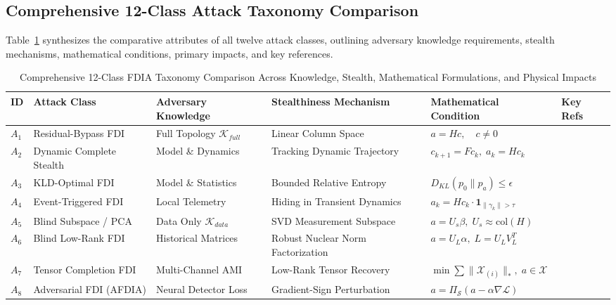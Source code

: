 \documentclass[journal,compsoc]{IEEEtran}
\begin{document}
\subsection{Comprehensive 12-Class Attack Taxonomy Comparison}
Table~\ref{tab:attack_taxonomy} synthesizes the comparative attributes of all twelve attack classes, outlining adversary knowledge requirements, stealth mechanisms, mathematical conditions, primary impacts, and key references.

\begin{table}[!t]
\centering
\caption{Comprehensive 12-Class FDIA Taxonomy Comparison Across Knowledge, Stealth, Mathematical Formulations, and Physical Impacts}
\label{tab:attack_taxonomy}
\small
\begin{tabularx}{\textwidth}{l p{3.2cm} p{2.2cm} p{3.2cm} p{3.5cm} p{1.8cm}}
\toprule
\textbf{ID} & \textbf{Attack Class} & \textbf{Adversary Knowledge} & \textbf{Stealthiness Mechanism} & \textbf{Mathematical Condition} & \textbf{Key Refs} \\
\midrule
$A_1$ & Residual-Bypass FDI & Full Topology $\mathcal{K}_{full}$ & Linear Column Space & $a = Hc, \quad c \ne 0$ & \cite{ref29, ref6, ref8, ref50, ref51} \\
$A_2$ & Dynamic Complete Stealth & Model \& Dynamics & Tracking Dynamic Trajectory & $c_{k+1} = F c_k, \; a_k = H c_k$ & \cite{ref19, ref30, ref26, ref33} \\
$A_3$ & KLD-Optimal FDI & Model \& Statistics & Bounded Relative Entropy & $D_{KL}(p_0 \parallel p_a) \le \epsilon$ & \cite{ref7, ref11, ref63} \\
$A_4$ & Event-Triggered FDI & Local Telemetry & Hiding in Transient Dynamics & $a_k = H c_k \cdot \mathbf{1}_{\|\gamma_k\| > \tau}$ & \cite{ref25, ref76} \\
$A_5$ & Blind Subspace / PCA & Data Only $\mathcal{K}_{data}$ & SVD Measurement Subspace & $a = U_s \beta, \; U_s \approx \text{col}(H)$ & \cite{ref56, ref31, ref32, ref77} \\
$A_6$ & Blind Low-Rank FDI & Historical Matrices & Robust Nuclear Norm Factorization & $a = U_L \alpha, \; L = U_L V_L^T$ & \cite{ref48, ref39, ref41, ref49} \\
$A_7$ & Tensor Completion FDI & Multi-Channel AMI & Low-Rank Tensor Recovery & $\min \sum \|\mathcal{X}_{(i)}\|_*, \; a \in \mathcal{X}$ & \cite{ref59, ref37} \\
$A_8$ & Adversarial FDI (AFDIA) & Neural Detector Loss & Gradient-Sign Perturbation & $a = \Pi_{\mathcal{S}} (a - \alpha \nabla \mathcal{L})$ & \cite{ref35, ref80} \\

\end{tabularx}
\end{table}
\end{document}
